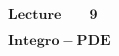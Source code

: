 \setcounter{section}{0}
\setcounter{equation}{0}
\newpage
\vspace*{\fill}
\begingroup
\thispagestyle{empty}
\begin{center}
    \fontsize{40pt}{0} $\mathbf{Lecture \qquad 9}$
    \par
    \fontsize{40pt}{0} $\mathbf{Integro-PDE}$
    \par
\end{center}
\endgroup
\vspace*{\fill}
\newpage